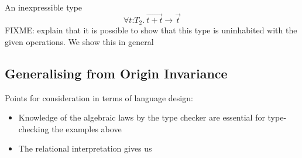 \begin{example}
\end{example}

\begin{example}
  An inexpressible type
  \begin{displaymath}
    \forall t \mathord: T_2.\ \vec{t + t} \to \vec{t}
  \end{displaymath}
  FIXME: explain that it is possible to show that this type is
  uninhabited with the given operations. We show this in general 
\end{example}

\subsection{Generalising from Origin Invariance}

Points for consideration in terms of language design:
\begin{itemize}
\item Knowledge of the algebraic laws by the type checker are
  essential for type-checking the examples above
\item The relational interpretation gives us 
\end{itemize}


